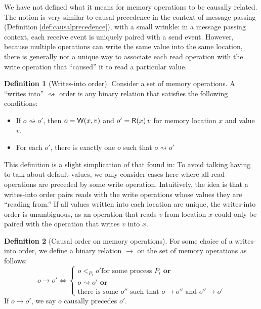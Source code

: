 \documentclass[]             %
{NASA}                       %
\theoremstyle{definition}
\newtheorem{definition}{Definition}[section]
\begin{document}
We have not defined what it means for memory operations to be causally
related. The notion is very similar to causal precedence in the
context of message passing (Definition \ref{def:causalprecedence}),
with a small wrinkle: in a message passing context, each receive event
is uniquely paired with a send event. However, because multiple
operations can write the same value into the same location, there is
generally not a unique way to associate each read operation with the
write operation that ``caused'' it to read a particular value.

\begin{definition}[Writes-into order]
  Consider a set of memory operations. A ``writes into''
  $\rightsquigarrow$ order is any binary relation that satisfies the
  following conditions:
  \begin{itemize}
  \item If $o \rightsquigarrow o'$, then $o = \mathsf{W}\!\left(x, v\right)$ and $o' = \mathsf{R}\!\left(x\right){v}$ for memory location $x$ and value $v$.
  \item For each $o'$, there is exactly one $o$ such that $o \rightsquigarrow o'$
  \end{itemize}
\end{definition}

This definition is a slight simplication of that found
in\citationneeded: To avoid talking having to talk about default
values, we only consider cases here where all read operations are
preceded by some write operation. Intuitively, the idea is that a
writes-into order pairs reads with the write operations whose values
they are ``reading from.'' If all values written into each location
are unique, the writes-into order is unambiguous, as an operation that
reads $v$ from location $x$ could only be paired with the operation
that writes $v$ into $x$.

\begin{definition}[Causal order on memory operations]
  \label{def:memorycausalprecedence}
  For some choice of a writes-into order, we define a binary relation
  $\to$ on the set of memory operations as follows:
  \[o \to o' \iff
  \begin{cases}
    o <_{P_i} o' \textrm{for some process $P_i$}
    \textbf{ or} \\
    o \rightsquigarrow o'
    \textbf{ or} \\
    \textrm{there is some } o'' \textrm{ such that } o \to o'' \textrm{ and } o'' \to o'
  \end{cases}
  \]
  If $o \to o'$, we say $o$ causally precedes $o'$.
\end{definition}
\end{document}
